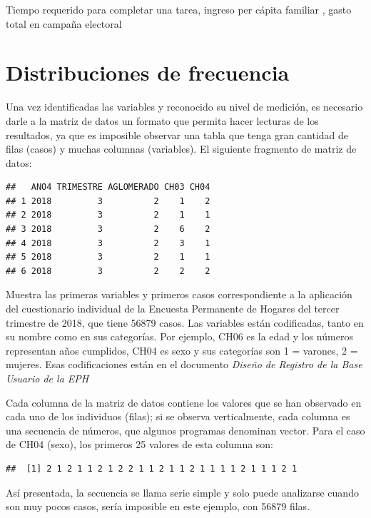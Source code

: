 \documentclass[]{book}
\begin{document}
Tiempo requerido para completar una tarea, ingreso per cápita familiar \citet{INDEC2018}, gasto total en campaña electoral \citet{MoralesQuiroga2010}

\hypertarget{distribuciones-de-frecuencia}{%
\chapter{Distribuciones de frecuencia}\label{distribuciones-de-frecuencia}}

Una vez identificadas las variables y reconocido su nivel de medición, es necesario darle a la matriz de datos un formato que permita hacer lecturas de los resultados, ya que es imposible observar una tabla que tenga gran cantidad de filas (casos) y muchas columnas (variables).
El siguiente fragmento de matriz de datos:

\begin{verbatim}
##   ANO4 TRIMESTRE AGLOMERADO CH03 CH04
## 1 2018         3          2    1    2
## 2 2018         3          2    1    1
## 3 2018         3          2    6    2
## 4 2018         3          2    3    1
## 5 2018         3          2    1    1
## 6 2018         3          2    2    2
\end{verbatim}

Muestra las primeras variables y primeros casos correspondiente a la aplicación del cuestionario individual de la Encuesta Permanente de Hogares \citet{INDEC2018} del tercer trimestre de 2018, que tiene 56879 casos. Las variables están codificadas, tanto en su nombre como en sus categorías. Por ejemplo, CH06 es la edad y los números representan años cumplidos, CH04 es sexo y sus categorías son 1 = varones, 2 = mujeres. Esas codificaciones están en el documento \emph{Diseño de Registro de la Base Usuario de la EPH} \citet{INDEC2009}

Cada columna de la matriz de datos contiene los valores que se han observado en cada uno de los individuos (filas); si se observa verticalmente, cada columna es una secuencia de números, que algunos programas denominan vector. Para el caso de CH04 (sexo), los primeros 25 valores de esta columna son:

\begin{verbatim}
##  [1] 2 1 2 1 1 2 1 2 2 1 1 2 1 1 2 1 1 1 1 2 1 1 1 2 1
\end{verbatim}

Así presentada, la secuencia se llama serie simple y solo puede analizarse cuando son muy pocos casos, sería imposible en este ejemplo, con 56879 filas.
\end{document}
